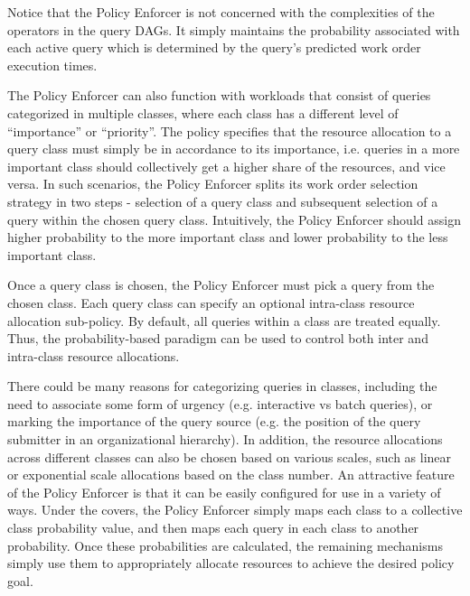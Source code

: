 Notice that the Policy Enforcer is not concerned with the complexities of the operators in the query DAGs. 
It simply maintains the probability associated with each active query which is determined by the query's predicted work order execution times.

The Policy Enforcer can also function with workloads that consist of queries categorized in multiple classes, where each class has a different level of ``importance'' or ``priority''. 
The policy specifies that the resource allocation to a query class must simply be in accordance to its importance, i.e. queries in a more important class should collectively get a higher share of the resources, and vice versa.
In such scenarios, the Policy Enforcer splits its work order selection strategy in two steps - selection of a query class and subsequent selection of a 
query within the chosen query class.
Intuitively, the Policy Enforcer should assign higher probability to the more 
important class and lower probability to the less important class.

Once a query class is chosen, the Policy Enforcer must pick a query from the chosen class. 
Each query class can specify an optional intra-class resource allocation sub-policy. 
By default, all queries within a class are treated equally.
Thus, the probability-based paradigm can be used to control both inter and intra-class resource allocations.

There could be many reasons for categorizing queries in classes, including the need to associate some form of urgency (e.g. interactive vs batch queries), or marking the importance of the query source 
(e.g. the position of the query submitter in an organizational hierarchy). 
In addition, the resource allocations across different classes can also be chosen based on various scales, such as linear or exponential scale allocations based on the class number. 
An attractive feature of the Policy Enforcer is that it can be easily configured for use in a variety of ways.
Under the covers, the Policy Enforcer simply maps each class to a collective class probability value, and then maps each query in each class to another probability. 
Once these probabilities are calculated, the remaining mechanisms simply use them to appropriately allocate resources to achieve the desired policy goal.